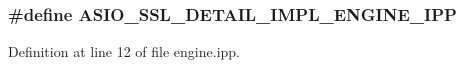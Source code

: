 \subsubsection[{A\+S\+I\+O\+\_\+\+S\+S\+L\+\_\+\+D\+E\+T\+A\+I\+L\+\_\+\+I\+M\+P\+L\+\_\+\+E\+N\+G\+I\+N\+E\+\_\+\+I\+P\+P}]{\setlength{\rightskip}{0pt plus 5cm}\#define A\+S\+I\+O\+\_\+\+S\+S\+L\+\_\+\+D\+E\+T\+A\+I\+L\+\_\+\+I\+M\+P\+L\+\_\+\+E\+N\+G\+I\+N\+E\+\_\+\+I\+P\+P}\label{engine_8ipp_a7420a9c454ba8ae736e1c326ce49c86a}


Definition at line 12 of file engine.\+ipp.


